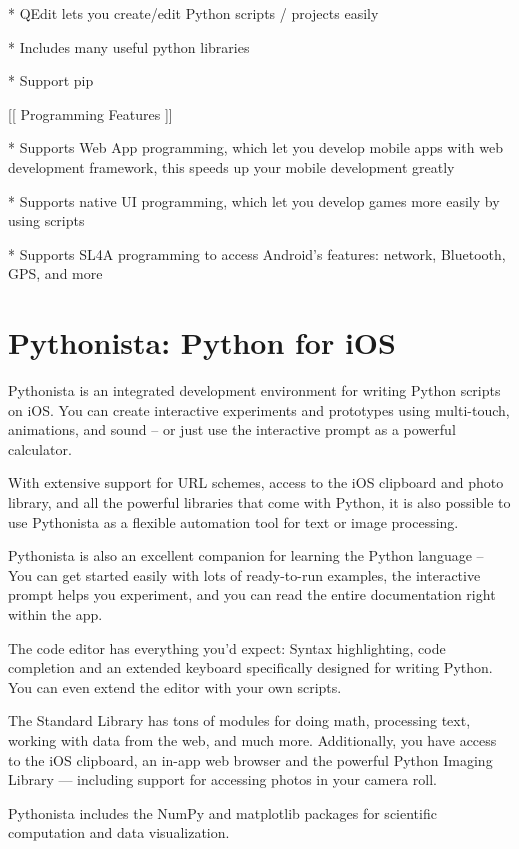 * QEdit lets you create/edit Python scripts / projects easily 

* Includes many useful python libraries 

* Support pip 

[[ Programming Features ]] 

* Supports Web App programming, which let you develop mobile apps with web development framework, this speeds up your mobile development greatly 

* Supports native UI programming, which let you develop games more easily by using scripts 

* Supports SL4A programming to access Android’s features: network, Bluetooth, GPS, and more



\newpage
\section{Pythonista: Python for iOS}

Pythonista is an integrated development environment for writing Python scripts on iOS. You can create interactive experiments and prototypes using multi-touch, animations, and sound – or just use the interactive prompt as a powerful calculator.

With extensive support for URL schemes, access to the iOS clipboard and photo library, and all the powerful libraries that come with Python, it is also possible to use Pythonista as a flexible automation tool for text or image processing.

Pythonista is also an excellent companion for learning the Python language – You can get started easily with lots of ready-to-run examples, the interactive prompt helps you experiment, and you can read the entire documentation right within the app.

The code editor has everything you'd expect: Syntax highlighting, code completion and an extended keyboard specifically designed for writing Python. You can even extend the editor with your own scripts.

The Standard Library has tons of modules for doing math, processing text, working with data from the web, and much more. Additionally, you have access to the iOS clipboard, an in-app web browser and the powerful Python Imaging Library — including support for accessing photos in your camera roll.

Pythonista includes the NumPy and matplotlib packages for scientific computation and data visualization. 

